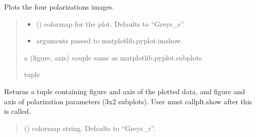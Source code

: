 \documentclass[letterpaper,10pt,english]{sphinxmanual}
\begin{document}
\begin{fulllineitems}
\begin{fulllineitems}
\label{\detokenize{micropolarray:micropolarray.micropol_image.MicropolImage.show_single_pol_images}}
\pysigstartsignatures
{}
\pysigstopsignatures
\sphinxAtStartPar
Plots the four polarizations images.
\begin{quote}\begin{description}
\begin{itemize}
\item {} 
\sphinxAtStartPar
{} (\sphinxstyleliteralemphasis{\sphinxupquote{, }}) \textendash{} colormap for the plot. Defaults to “Greys\_r”.

\item {} 
\sphinxAtStartPar
{} \textendash{} arguments passed to matplotlib.pyplot.imshow.

\end{itemize}

\sphinxAtStartPar
a (figure, axis) couple same as matplotlib.pyplot.subplots

\sphinxAtStartPar
tuple

\end{description}\end{quote}

\end{fulllineitems}


\begin{fulllineitems}
\label{\detokenize{micropolarray:micropolarray.micropol_image.MicropolImage.show_with_pol_params}}
\pysigstartsignatures
{}
\pysigstopsignatures
\sphinxAtStartPar
Returns a tuple containing figure and axis of the plotted
data, and figure and axis of polarization parameters (3x2
subplots). User must callplt.show after this is called.
\begin{quote}\begin{description}
\sphinxAtStartPar
{} (\sphinxstyleliteralemphasis{\sphinxupquote{, }}) \textendash{} colormap string. Defaults to “Greys\_r”.


\end{description}
\end{quote}
\end{fulllineitems}
\end{fulllineitems}
\end{document}
